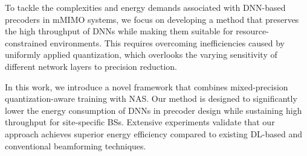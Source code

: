 To tackle the complexities and energy demands associated with \gls{DNN}-based precoders in mMIMO systems, we focus on developing a method that preserves the high throughput of \glspl{DNN} while making them suitable for resource-constrained environments. This requires overcoming inefficiencies caused by uniformly applied quantization, which overlooks the varying sensitivity of different network layers to precision reduction.

In this work, we introduce a novel framework that combines mixed-precision quantization-aware training with \gls{NAS}. Our method is designed to significantly lower the energy consumption of \glspl{DNN} in precoder design while sustaining high throughput for site-specific \glspl{BS}. Extensive experiments validate that our approach achieves superior energy efficiency compared to existing \gls{DL}-based and conventional beamforming techniques.


